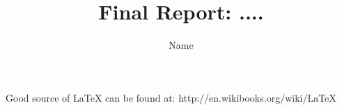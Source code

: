 \documentclass[10pt,twocolumn]{article}
\title{\textbf{Final Report: ....}}
\author{Name}
\date{}
\begin{document}
\maketitle





Good source of \LaTeX
can be found at: http://en.wikibooks.org/wiki/LaTeX




\end{document}
